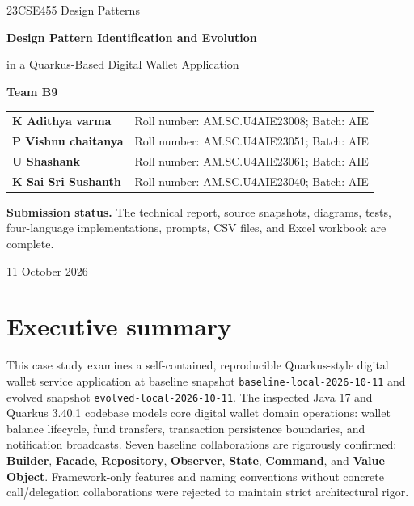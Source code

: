 \documentclass[11pt,a4paper]{article}
\begin{document}
\begin{titlepage}
    \centering
    \vspace*{3cm}
    {\large 23CSE455 Design Patterns\par}
    \vspace{1.5cm}
    {\LARGE\bfseries Design Pattern Identification and Evolution\par}
    \vspace{0.5cm}
    {\large in a Quarkus-Based Digital Wallet Application\par}
    \vspace{2cm}
    {\large\textbf{Team B9}\par}
    \vspace{1.5cm}
    \begin{tabular}{ll}
        \textbf{K Adithya varma} & Roll number: AM.SC.U4AIE23008; Batch: AIE \\
        \textbf{P Vishnu chaitanya} & Roll number: AM.SC.U4AIE23051; Batch: AIE \\
        \textbf{U Shashank} & Roll number: AM.SC.U4AIE23061; Batch: AIE \\
        \textbf{K Sai Sri Sushanth} & Roll number: AM.SC.U4AIE23040; Batch: AIE \\
    \end{tabular}
    \vfill
    {\small\textbf{Submission status.} The technical report, source snapshots, diagrams, tests, four-language implementations, prompts, CSV files, and Excel workbook are complete.\par}
    \vspace{1.5cm}
    {\large 11 October 2026\par}
\end{titlepage}

\tableofcontents
\newpage
{}

\section{Executive summary}
This case study examines a self-contained, reproducible Quarkus-style digital wallet service application at baseline snapshot \texttt{baseline-local-2026-10-11} and evolved snapshot \texttt{evolved-local-2026-10-11}. The inspected Java 17 and Quarkus 3.40.1 codebase models core digital wallet domain operations: wallet balance lifecycle, fund transfers, transaction persistence boundaries, and notification broadcasts. Seven baseline collaborations are rigorously confirmed: \textbf{Builder}, \textbf{Facade}, \textbf{Repository}, \textbf{Observer}, \textbf{State}, \textbf{Command}, and \textbf{Value Object}. Framework-only features and naming conventions without concrete call/delegation collaborations were rejected to maintain strict architectural rigor.
\end{document}
